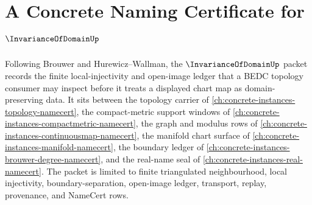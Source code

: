 \chapter{A Concrete Naming Certificate for $\InvarianceOfDomainUp$}
\label{ch:concrete-instances-invariance-of-domain-namecert}

Following Brouwer and Hurewicz--Wallman, the $\InvarianceOfDomainUp$ packet records the finite local-injectivity and open-image ledger that a BEDC topology consumer may inspect before it treats a displayed chart map as domain-preserving data. It sits between the topology carrier of \autoref{ch:concrete-instances-topology-namecert}, the compact-metric support windows of \autoref{ch:concrete-instances-compactmetric-namecert}, the graph and modulus rows of \autoref{ch:concrete-instances-continuousmap-namecert}, the manifold chart surface of \autoref{ch:concrete-instances-manifold-namecert}, the boundary ledger of \autoref{ch:concrete-instances-brouwer-degree-namecert}, and the real-name seal of \autoref{ch:concrete-instances-real-namecert}. The packet is limited to finite triangulated neighbourhood, local injectivity, boundary-separation, open-image ledger, transport, replay, provenance, and NameCert rows.

